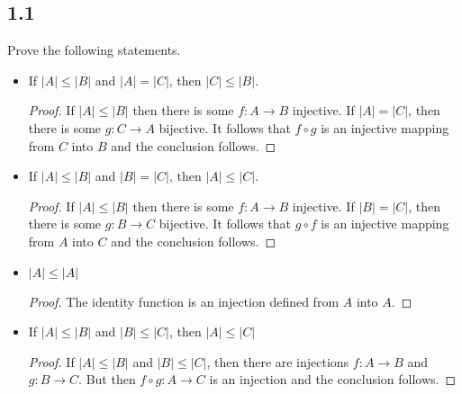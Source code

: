 \subsection*{1.1} Prove the following statements.

\begin{itemize}
    \item If $|A| \leq |B|$ and $|A| = |C|$, then $|C| \leq |B|$.
    
    \begin{proof}
    If $|A| \leq |B|$ then there is some $f:A \rightarrow B$ injective. If $|A| = |C|$, then there is some $g: C \rightarrow A$ bijective. It follows that $f \circ g$ is an injective mapping from $C$ into $B$ and the conclusion follows.
    \end{proof}
    
    \item If $|A| \leq |B|$ and $|B| = |C|$, then $|A| \leq |C|$.
    
    \begin{proof}
    If $|A| \leq |B|$ then there is some $f:A \rightarrow B$ injective. If $|B| = |C|$, then there is some $g: B \rightarrow C$ bijective. It follows that $g \circ f$ is an injective mapping from $A$ into $C$ and the conclusion follows.
    \end{proof}
    
    \item $|A| \leq |A|$
    
    \begin{proof}
    The identity function is an injection defined from $A$ into $A$.
    \end{proof}
    
    \item If $|A| \leq |B|$ and $|B| \leq |C|$, then $|A| \leq |C|$
    
    \begin{proof}
    If $|A| \leq |B|$ and $|B| \leq |C|$, then there are injections $f:A \rightarrow B$ and $g:B \rightarrow C$. But then $f \circ g: A \rightarrow C$ is an injection and the conclusion follows.
    \end{proof}
    
\end{itemize}

